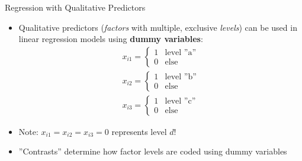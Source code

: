 \documentclass[ignorenonframetext,xcolor=x11names]{beamer}
\begin{document}
\begin{frame}{Regression with Qualitative Predictors}
\begin{itemize}
  \item Qualitative predictors (\emph{factors} with multiple, exclusive \emph{levels}) can be used in linear regression models using \textbf{dummy variables}:
\begin{align*}
x_{i1} = \begin{cases}
1 & \text{level ''a''} \\
0 & \text{else}
\end{cases} \\
x_{i2} = \begin{cases}
1 & \text{level ''b''} \\
0 & \text{else}
\end{cases} \\
x_{i3} = \begin{cases}
1 & \text{level ''c''} \\
0 & \text{else}
\end{cases}
\end{align*}
\item Note: $x_{i1} = x_{i2} = x_{i3} = 0$ represents level $d$!
\item ''Contrasts'' determine how factor levels are coded using dummy variables
\end{itemize}
\end{frame}
\end{document}
